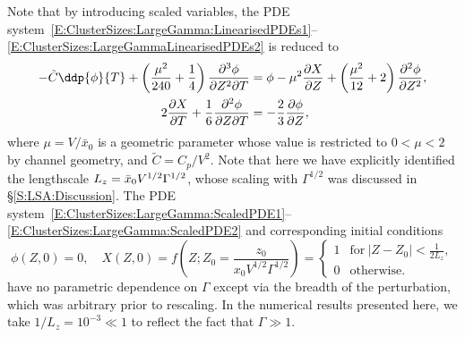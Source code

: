 Note that by introducing scaled variables,
the PDE system~\eqref{E:ClusterSizes:LargeGamma:LinearisedPDEs1}--\eqref{E:ClusterSizes:LargeGammaLinearisedPDEs2} is reduced to
\begin{align}
- \tilde{C}\ddp{\phi}{T}+ \left(\frac{\mu^2}{240} + \frac{1}{4}\right) \frac{\partial^3 \phi}{\partial Z^2 \partial T} &= \phi - \mu^2 \frac{\partial X}{\partial Z} + \left(\frac{\mu^2}{12} + 2   \right)\frac{\partial^2 \phi}{\partial Z^2},\label{E:ClusterSizes:LargeGamma:ScaledPDE1}\\
2\frac{\partial X}{\partial T} +\frac{1}{6} \frac{\partial^2 \phi}{\partial Z \partial T} &= -\frac{2}{3} \frac{\partial \phi}{\partial Z},\label{E:ClusterSizes:LargeGamma:ScaledPDE2}
\end{align}
where $\mu = V/\bar{x}_0$ is a geometric parameter whose value is restricted to $0 < \mu < 2$ by channel geometry, and $\tilde{C} = C_p /V^2$. Note that here we have explicitly identified the lengthscale $L_z =  \bar{x}_0V^{1/2}\Gamma^{1/2}$, whose scaling with $\Gamma^{1/2}$ was discussed in \S\ref{S:LSA:Discussion}. The PDE system~\eqref{E:ClusterSizes:LargeGamma:ScaledPDE1}--\eqref{E:ClusterSizes:LargeGamma:ScaledPDE2} and corresponding initial conditions
\begin{equation}\label{E:ClusterSizes:LargeGamma:ICscaled2}
\phi(Z,0) = 0, \quad  X(Z,0) = f\left(Z; Z_0 = \frac{z_0}{x_0 V^{1/2}\Gamma^{1/2}} \right) =
\begin{cases}
1& \text{for}~|Z-Z_0| < \frac{1}{2L_z},\\
0 & \text{otherwise}.
\end{cases}
\end{equation}
have no parametric dependence on $\Gamma$ except via the breadth of the perturbation, which was arbitrary prior to rescaling. In the numerical results presented here, we take $1/L_z = 10^{-3} \ll 1$ to reflect the fact that $\Gamma \gg 1$.


